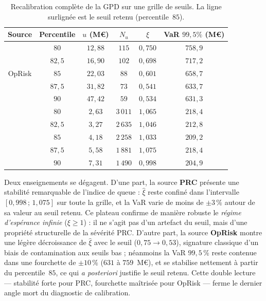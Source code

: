 \documentclass[11pt,a4paper]{article}
\theoremstyle{navystyle}
\theoremstyle{navydef}
\begin{document}
\begin{table}[h]
\centering
\setlength{\tabcolsep}{6pt}
\renewcommand{\arraystretch}{1.2}
\begin{tabular}{c c c c c c}
\toprule
\rowcolor{lightblue}
\textbf{Source} & \textbf{Percentile} & \textbf{$u$ (M\euro)} & \textbf{$N_u$} & \textbf{$\hat\xi$} & \textbf{VaR $99{,}5\%$ (M\euro)} \\
\midrule
\multirow{5}{*}{OpRisk}
 & $80$   & $12{,}88$ & $115$ & $0{,}750$ & $758{,}9$ \\
 & $82{,}5$ & $16{,}90$ & $102$ & $0{,}698$ & $717{,}2$ \\
 & \cellcolor{lightblue!40}$85$ & \cellcolor{lightblue!40}$22{,}03$ & \cellcolor{lightblue!40}$88$ & \cellcolor{lightblue!40}$0{,}601$ & \cellcolor{lightblue!40}$658{,}7$ \\
 & $87{,}5$ & $31{,}82$ & $73$ & $0{,}541$ & $633{,}7$ \\
 & $90$   & $47{,}42$ & $59$ & $0{,}534$ & $631{,}3$ \\
\addlinespace
\multirow{5}{*}{PRC}
 & $80$   & $2{,}63$ & $3\,011$ & $1{,}065$ & $218{,}4$ \\
 & $82{,}5$ & $3{,}27$ & $2\,635$ & $1{,}046$ & $212{,}8$ \\
 & \cellcolor{lightblue!40}$85$ & \cellcolor{lightblue!40}$4{,}18$ & \cellcolor{lightblue!40}$2\,258$ & \cellcolor{lightblue!40}$1{,}033$ & \cellcolor{lightblue!40}$209{,}2$ \\
 & $87{,}5$ & $5{,}58$ & $1\,881$ & $1{,}075$ & $218{,}4$ \\
 & $90$   & $7{,}31$ & $1\,490$ & $0{,}998$ & $204{,}9$ \\
\bottomrule
\end{tabular}
\caption{Recalibration complète de la GPD sur une grille de seuils. La ligne surlignée est le seuil retenu (percentile~$85$).}
\label{tab:seuil}
\end{table}

Deux enseignements se dégagent. D'une part, la source \textbf{PRC} présente une stabilité remarquable de l'indice de queue : $\hat\xi$ reste confiné dans l'intervalle $[0{,}998\,;\,1{,}075]$ sur toute la grille, et la VaR varie de moins de $\pm3\,\%$ autour de sa valeur au seuil retenu. Ce plateau confirme de manière robuste le \emph{régime d'espérance infinie} ($\xi\ge1$) : il ne s'agit pas d'un artefact du seuil, mais d'une propriété structurelle de la sévérité PRC. D'autre part, la source \textbf{OpRisk} montre une légère décroissance de $\hat\xi$ avec le seuil ($0{,}75\to0{,}53$), signature classique d'un biais de contamination aux seuils bas ; néanmoins la VaR $99{,}5\,\%$ reste contenue dans une fourchette de $\pm10\,\%$ ($631$ à $759$~M\euro), et se stabilise nettement à partir du percentile~$85$, ce qui \emph{a posteriori} justifie le seuil retenu. Cette double lecture --- stabilité forte pour PRC, fourchette maîtrisée pour OpRisk --- ferme le dernier angle mort du diagnostic de calibration.
\end{document}
